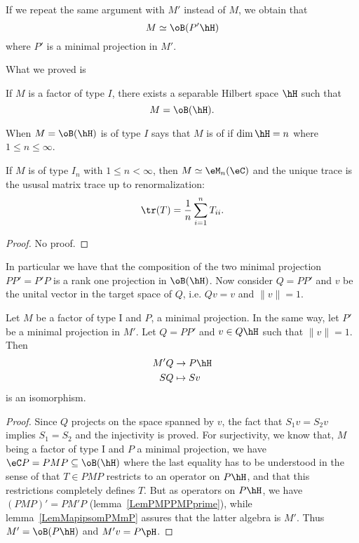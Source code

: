 If we repeat the same argument with $M'$ instead of $M$, we obtain that
\begin{equation}		\label{EqMPHtypeIBh}
	M\simeq\oB(P'\hH)
\end{equation}
where $P'$ is a minimal projection in $M'$.

What we proved is
\begin{proposition}
	If $M$ is a factor of type $I$, there exists a separable Hilbert space $\hH$ such that
	\begin{equation}
		M=\oB(\hH).
	\end{equation}
\end{proposition}

When $M=\oB(\hH)$ is of type $I$ says that $M$ is of  if $\dim\hH=n$ where $1\leq n \leq\infty$.

\begin{proposition}
	If $M$ is of type $I_n$ with $1\leq n <\infty$, then $M\simeq \eM_n(\eC)$ and the unique trace is the ususal matrix trace up to renormalization:
	\begin{equation}
		\tr(T)=\frac{1}{ n }\sum_{i=1}^nT_{ii}.
	\end{equation}
\end{proposition}
\begin{proof}
	No proof.
\end{proof}

In particular we have that the composition of the two minimal projection $PP'=P'P$ is a rank one projection in $\oB(\hH)$. Now consider $Q=PP'$ and $v$ be the unital vector in the target space of $Q$, i.e. $Qv=v$ and $\| v \|=1$.

\begin{proposition}
	Let $M$ be a factor of type I and $P$, a minimal projection. In the same way, let $P'$ be a minimal projection in $M'$. Let $Q=PP'$ and $v\in Q\hH$ such that $\| v \|=1$. Then
	\begin{equation}
		\begin{aligned}
			M'Q & \to P\hH   \\
			SQ  & \mapsto Sv
		\end{aligned}
	\end{equation}
	is an isomorphism.
\end{proposition}

\begin{proof}
	Since $Q$ projects on the space spanned by $v$, the fact that $S_1v=S_2v$ implies $S_1=S_2$ and the injectivity is proved. For surjectivity, we know that, $M$ being a factor of type I and $P$ a minimal projection, we have $\eC P=PMP\subseteq\oB(\hH)$ where the last equality has to be understood in the sense of that $T\in PMP$ restricts to an operator on $P\hH$, and that this restrictions completely defines $T$. But as operators on $P\hH$, we have $(PMP)'=PM'P$ (lemma~\ref{LemPMPPMPprime}), while lemma~\ref{LemMapipsomPMmP} assures that the latter algebra is $M'$. Thus $M'=\oB(P\hH)$ and $M'v=P\pH$.
\end{proof}

